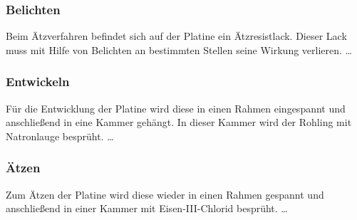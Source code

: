 \subsubsection{Belichten}
Beim Ätzverfahren befindet sich auf der Platine ein Ätzresistlack. Dieser Lack muss mit Hilfe von Belichten an bestimmten Stellen seine Wirkung verlieren. \ldots

\subsubsection{Entwickeln}
Für die Entwicklung der Platine wird diese in einen Rahmen eingespannt und anschließend in eine Kammer gehängt. In dieser Kammer wird der Rohling mit Natronlauge besprüht. \ldots

\subsubsection{Ätzen}
Zum Ätzen der Platine wird diese wieder in einen Rahmen gespannt und anschließend in einer Kammer mit Eisen-III-Chlorid besprüht. \ldots
